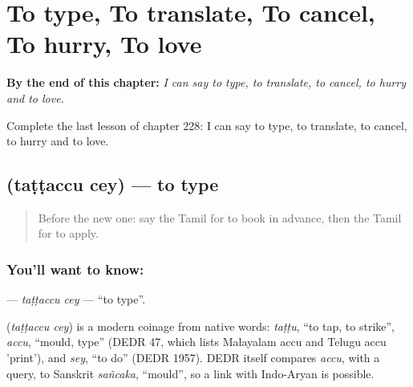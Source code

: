 
\chapter{To type, To translate, To cancel, To hurry, To love}
\label{ch:ta-to-type-to-translate-to-cancel-to-hurry-to-love}

\begin{chapteropening}
\textbf{By the end of this chapter:} \emph{I can say to type, to translate, to cancel, to hurry and to love.}

Complete the last lesson of chapter 228: I can say to type, to translate, to cancel, to hurry and to love.
\end{chapteropening}

\section[\texorpdfstring{\ta{தட்டச்சு} \ta{செய்} (taṭṭaccu cey)}{தட்டச்சு செய் (taṭṭaccu cey)}]{  (taṭṭaccu cey) — to type}

\label{lesson:TA-C228-tattaccu-cey}



\begin{quote}
Before the new one: say the Tamil for to book in advance, then the Tamil for to apply.
\end{quote}

\subsection*{You'll want to know:  }
\textbf{ } — \emph{taṭṭaccu cey} — \textquotedblleft{}to type\textquotedblright{}.

\begin{cousinweb}
\textbf{ } (\emph{taṭṭaccu cey}) is a modern coinage from native words: \emph{taṭṭu}, \textquotedblleft{}to tap, to strike\textquotedblright{}, \emph{accu}, \textquotedblleft{}mould, type\textquotedblright{} (DEDR 47, which lists Malayalam accu and Telugu accu 'print'), and \emph{sey}, \textquotedblleft{}to do\textquotedblright{} (DEDR 1957). DEDR itself compares \emph{accu}, with a query, to Sanskrit \emph{sañcaka}, \textquotedblleft{}mould\textquotedblright{}, so a link with Indo-Aryan is possible.
\end{cousinweb}

